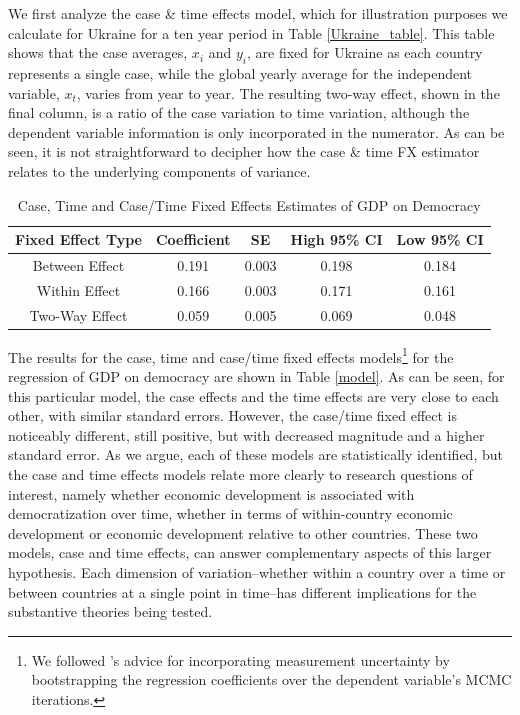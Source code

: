 \documentclass{article}[12pt]
\begin{document}
We first analyze the case \& time effects model, which for illustration purposes we calculate for Ukraine for a ten year period in Table \ref{Ukraine_table}. This table shows that the case averages, $x_i$ and $y_i$, are fixed for Ukraine as each country represents a single case, while the global yearly average for the independent variable, $x_t$, varies from year to year. The resulting two-way effect, shown in the final column, is a ratio of the case variation to time variation, although the dependent variable information is only incorporated in the numerator. As can be seen, it is not straightforward to decipher how the case \& time FX estimator relates to the underlying components of variance.
\begin{table}[ht]
	\centering
	\begin{tabular}{ccccc}
		Fixed Effect Type & Coefficient & SE & High 95\% CI & Low 95\% CI \\
		\midrule
		Between Effect & 0.191 & 0.003 & 0.198 & 0.184 \\ Within Effect & 0.166 & 0.003 & 0.171 & 0.161 \\ Two-Way Effect & 0.059 & 0.005 & 0.069 & 0.048 \\	\end{tabular}
	\caption{Case, Time and Case/Time Fixed Effects Estimates of GDP on Democracy} 
	\label{onetwogdp}
\end{table}

The results for the case, time and case/time fixed effects models\footnote{We followed \textcite{bizarro2016}'s advice for incorporating measurement uncertainty by bootstrapping the regression coefficients over the dependent variable's MCMC iterations.} for the regression of GDP on democracy are shown in Table \ref{model}. As can be seen, for this particular model, the case effects and the time effects are very close to each other, with similar standard errors. However, the case/time fixed effect is noticeably different, still positive, but with decreased magnitude and a higher standard error. As we argue, each of these models are statistically identified, but the case and time effects models relate more clearly to research questions of interest, namely whether economic development is associated with democratization over time, whether in terms of within-country economic development or economic development relative to other countries. These two models, case and time effects, can answer complementary aspects of this larger hypothesis. Each dimension of variation--whether within a country over a time or between countries at a single point in time--has different implications for the substantive theories being tested.
\end{document}
